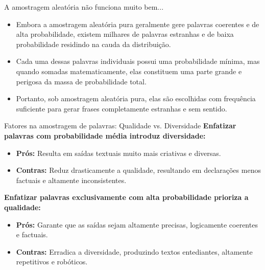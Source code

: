 \documentclass[aspectratio=169]{beamer}
\begin{document}
\begin{frame}{A amostragem aleatória não funciona muito bem...}\justifying
    \begin{itemize}
        \item Embora a amostragem aleatória pura geralmente gere palavras coerentes e de alta probabilidade, existem milhares de palavras estranhas e de baixa probabilidade residindo na cauda da distribuição.
        \item Cada uma dessas palavras individuais possui uma probabilidade mínima, mas quando somadas matematicamente, elas constituem uma parte grande e perigosa da massa de probabilidade total.
        \item Portanto, sob amostragem aleatória pura, elas são escolhidas com frequência suficiente para gerar frases completamente estranhas e sem sentido.
    \end{itemize}
\end{frame}

\begin{frame}{Fatores na amostragem de palavras: Qualidade vs. Diversidade}\justifying
    \textbf{Enfatizar palavras com probabilidade média introduz diversidade:}
    \begin{itemize}
        \item \textbf{Prós:} Resulta em saídas textuais muito mais criativas e diversas.
        \item \textbf{Contras:} Reduz drasticamente a qualidade, resultando em declarações menos factuais e altamente inconsistentes.
    \end{itemize}
    \vspace{0.5cm}
    \textbf{Enfatizar palavras exclusivamente com alta probabilidade prioriza a qualidade:}
    \begin{itemize}
        \item \textbf{Prós:} Garante que as saídas sejam altamente precisas, logicamente coerentes e factuais.
        \item \textbf{Contras:} Erradica a diversidade, produzindo textos entediantes, altamente repetitivos e robóticos.
    \end{itemize}
\end{frame}
\end{document}

